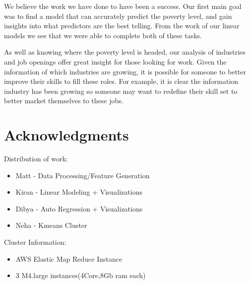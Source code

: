 \documentclass[11pt,letterpaper]{article}
\begin{document}
We believe the work we have done to have been a success. Our first main goal was to find a model that can accurately predict the poverty level, and gain insights into what predictors are the best telling. From the work of our linear models we see that we were able to complete both of these tasks. 

As well as knowing where the poverty level is headed, our analysis of industries and job openings offer great insight for those looking for work. Given the information of which industries are growing, it is possible for someone to better improve their skills to fill these roles. For example, it is clear the information industry has been growing so someone may want to redefine their skill set to better market themselves to these jobs. 
\pagebreak
\section*{Acknowledgments}
Distribution of work:
\begin{itemize}
	\item {Matt - Data Processing/Feature Generation}
	\item {Kiran - Linear Modeling + Visualizations}
	\item {Dibya - Auto Regression + Visualizations}
	\item {Neha - Kmeans Cluster}
\end{itemize}

Cluster Information:
\begin{itemize}
	\item{AWS Elastic Map Reduce Instance}
	\item{3 M4.large instances(4Core,8Gb ram each)}
\end{itemize}



\end{document}
